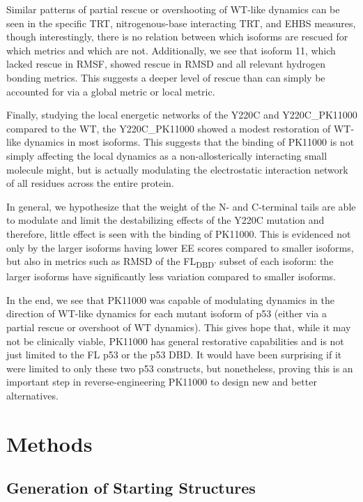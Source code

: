 Similar patterns of partial rescue or overshooting of WT-like dynamics can be seen in the specific TRT, nitrogenous-base interacting TRT, and EHBS measures, though interestingly, there is no relation between which isoforms are rescued for which metrics and which are not. Additionally, we see that isoform \num{11}, which lacked rescue in RMSF, showed rescue in RMSD and all relevant hydrogen bonding metrics. This suggests a deeper level of rescue than can simply be accounted for via a global metric or local metric.

Finally, studying the local energetic networks of the Y220C and Y220C\_PK11000 compared to the WT, the Y220C\_PK11000 showed a modest restoration of WT-like dynamics in most isoforms. This suggests that the binding of PK11000 is not simply affecting the local dynamics as a non-allosterically interacting small molecule might, but is actually modulating the electrostatic interaction network of all residues across the entire protein. 

In general, we hypothesize that the weight of the N- and C-terminal tails are able to modulate and limit the destabilizing effects of the Y220C mutation and therefore, little effect is seen with the binding of PK11000. This is evidenced not only by the larger isoforms having lower EE scores compared to smaller isoforms, but also in metrics such as RMSD of the FL\textbar\textsubscript{DBD'} subset of each isoform: the larger isoforms have significantly less variation compared to smaller isoforms.

In the end, we see that PK11000 was capable of modulating dynamics in the direction of WT-like dynamics for each mutant isoform of p53 (either via a partial rescue or overshoot of WT dynamics). This gives hope that, while it may not be clinically viable, PK11000 has general restorative capabilities and is not just limited to the FL p53 or the p53 DBD. It would have been surprising if it were limited to only these two p53 constructs, but nonetheless, proving this is an important step in reverse-engineering PK11000 to design new and better alternatives.

\section{Methods}

\subsection{Generation of Starting Structures}

